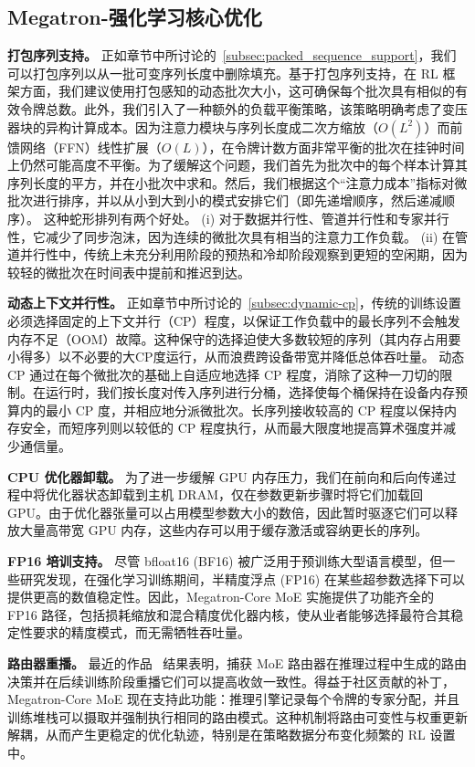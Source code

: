 \subsection{Megatron-强化学习核心优化}
\textbf{打包序列支持。} 正如章节中所讨论的~\ref{subsec:packed_sequence_support}，我们可以打包序列以从一批可变序列长度中删除填充。基于打包序列支持，在 RL 框架方面，我们建议使用打包感知的动态批次大小，这可确保每个批次具有相似的有效令牌总数。此外，我们引入了一种额外的负载平衡策略，该策略明确考虑了变压器块的异构计算成本。因为注意力模块与序列长度成二次方缩放（\(O(L^{2})\)）而前馈网络（FFN）线性扩展（\(O(L)\)），在令牌计数方面非常平衡的批次在挂钟时间上仍然可能高度不平衡。为了缓解这个问题，我们首先为批次中的每个样本计算其序列长度的平方，并在小批次中求和。然后，我们根据这个“注意力成本”指标对微批次进行排序，并以从小到大到小的模式安排它们（即先递增顺序，然后递减顺序）。
这种蛇形排列有两个好处。 (i) 对于数据并行性、管道并行性和专家并行性，它减少了同步泡沫，因为连续的微批次具有相当的注意力工作负载。 (ii) 在管道并行性中，传统上未充分利用阶段的预热和冷却阶段观察到更短的空闲期，因为较轻的微批次在时间表中提前和推迟到达。

\textbf{动态上下文并行性。} 正如章节中所讨论的~\ref{subsec:dynamic-cp}，传统的训练设置必须选择固定的上下文并行（CP）程度，以保证工作负载中的最长序列不会触发内存不足（OOM）故障。这种保守的选择迫使大多数较短的序列（其内存占用要小得多）以不必要的大CP度运行，从而浪费跨设备带宽并降低总体吞吐量。
动态 CP 通过在每个微批次的基础上自适应地选择 CP 程度，消除了这种一刀切的限制。在运行时，我们按长度对传入序列进行分桶，选择使每个桶保持在设备内存预算内的最小 CP 度，并相应地分派微批次。长序列接收较高的 CP 程度以保持内存安全，而短序列则以较低的 CP 程度执行，从而最大限度地提高算术强度并减少通信量。

\textbf{CPU 优化器卸载。} 为了进一步缓解 GPU 内存压力，我们在前向和后向传递过程中将优化器状态卸载到主机 DRAM，仅在参数更新步骤时将它们加载回 GPU。由于优化器张量可以占用模型参数大小的数倍，因此暂时驱逐它们可以释放大量高带宽 GPU 内存，这些内存可以用于缓存激活或容纳更长的序列。

\textbf{FP16 培训支持。} 尽管 bfloat16 (BF16) 被广泛用于预训练大型语言模型，但一些研究发现，在强化学习训练期间，半精度浮点 (FP16) 在某些超参数选择下可以提供更高的数值稳定性。因此，Megatron-Core MoE 实施提供了功能齐全的 FP16 路径，包括损耗缩放和混合精度优化器内核，使从业者能够选择最符合其稳定性要求的精度模式，而无需牺牲吞吐量。

\textbf{路由器重播。} 最近的作品~\cite{fan2025routerreplay} 结果表明，捕获 MoE 路由器在推理过程中生成的路由决策并在后续训练阶段重播它们可以提高收敛一致性。得益于社区贡献的补丁，Megatron-Core MoE 现在支持此功能：推理引擎记录每个令牌的专家分配，并且训练堆栈可以摄取并强制执行相同的路由模式。这种机制将路由可变性与权重更新解耦，从而产生更稳定的优化轨迹，特别是在策略数据分布变化频繁的 RL 设置中。



